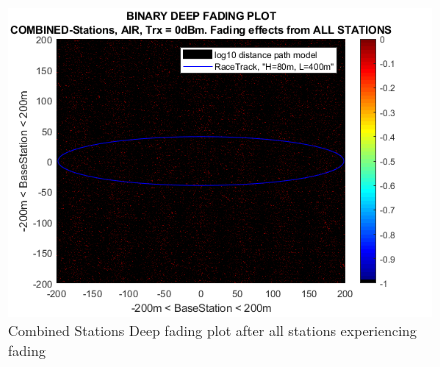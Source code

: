 \begin{figure}[H]
	\centering
	\includegraphics[width=\linewidth]{theory/fading/fig/binaryDeepFading_combinedStations_allStations.png}
	\caption{Combined Stations Deep fading plot after all stations experiencing fading}
	\label{fig:binaryDeepFading_combinedStations_allStations}
\end{figure}

